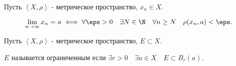 
\begin{definition} \thmslashn 

    Пусть $\left<X, \rho\right>$ - метрическое пространство, $x_{n}\in X$.

    \[ \lim\limits_{n \to \infty} x_{n} = a \iff \forall{\eps > 0}\quad \exists{N\in \N}\quad \forall{n \ge N}\quad \rho(x_{n}, a) < \eps .\] 
\end{definition}
\begin{definition} \thmslashn 

    Пусть $\left<X, \rho\right>$ - метрическое пространство, $E \subset X$.

    $E$ называется ограниченным если $\exists{r > 0}\quad \exists{a\in X}\quad E \subset B_{r}(a)$.
\end{definition}
